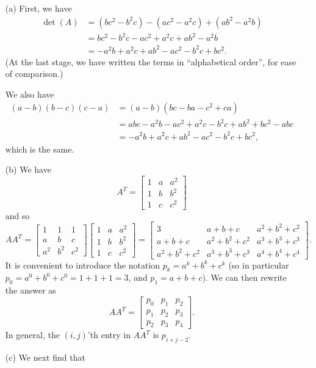 \documentclass[a4paper]{book}
\newcommand{\bbm}       {\begin{bmatrix}}
\newcommand{\ebm}       {\end{bmatrix}}
\renewcommand{\:}{\colon}
\theoremstyle{definition}
\renewenvironment{solution}{\SolutionInline}{\endSolutionInline}
\begin{document}
\begin{solution}
 \begin{itemize}
  \item[(a)] First, we have
   \begin{align*}
    \det(A) &= (bc^2 - b^2c) - (ac^2 - a^2c) + (ab^2 - a^2b) \\
            &= bc^2 - b^2c - ac^2 + a^2c + ab^2 - a^2b \\
            &= -a^2b + a^2c + ab^2 - ac^2 - b^2c + bc^2.
   \end{align*}
   (At the last stage, we have written the terms in ``alphabetical
   order'', for ease of comparison.)

   We also have
   \begin{align*}
    (a-b)(b-c)(c-a) &= (a-b)(bc-ba-c^2+ca) \\
                    &= abc-a^2b-ac^2+a^2c-b^2c+ab^2+bc^2-abc \\
                    &= -a^2b + a^2c + ab^2 - ac^2 - b^2c + bc^2,
   \end{align*}
   which is the same.
  \item[(b)] We have
   \[ A^T = \bbm
              1 & a & a^2 \\
              1 & b & b^2 \\
              1 & c & c^2
            \ebm
   \]
   and so
   \[ AA^T =
          \bbm
            1   & 1   & 1   \\
            a   & b   & c   \\
            a^2 & b^2 & c^2
          \ebm
          \bbm
            1 & a & a^2 \\
            1 & b & b^2 \\
            1 & c & c^2
          \ebm =
          \bbm
            3           & a+b+c       & a^2+b^2+c^2 \\
            a+b+c       & a^2+b^2+c^2 & a^3+b^3+c^3 \\
            a^2+b^2+c^2 & a^3+b^3+c^3 & a^4+b^4+c^4
          \ebm.
   \]
   It is convenient to introduce the notation
   $p_k=a^k+b^k+c^k$ (so in particular $p_0=a^0+b^0+c^0=1+1+1=3$, and
   $p_1=a+b+c$).  We can then rewrite the answer as
   \[  AA^T =
          \bbm
            p_0 & p_1 & p_2 \\
            p_1 & p_2 & p_3 \\
            p_2 & p_3 & p_4
          \ebm.
   \]
   In general, the $(i,j)$'th entry in $AA^T$ is $p_{i+j-2}$.
  \item[(c)]
   We next find that
   \begin{align*}

\end{align*}
\end{itemize}
\end{solution}
\end{document}
